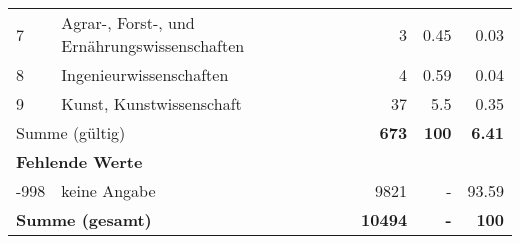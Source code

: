 \begin{longtable}{lXrrr}
     7 &
     \multicolumn{1}{X}{ Agrar-, Forst-, und Ernährungswissenschaften   } &


       \num{3} &
       \num[round-mode=places,round-precision=2]{0.45} &
         \num[round-mode=places,round-precision=2]{0.03} \\

     8 &
     \multicolumn{1}{X}{ Ingenieurwissenschaften   } &


       \num{4} &
       \num[round-mode=places,round-precision=2]{0.59} &
         \num[round-mode=places,round-precision=2]{0.04} \\

     9 &
     \multicolumn{1}{X}{ Kunst, Kunstwissenschaft   } &


       \num{37} &
       \num[round-mode=places,round-precision=2]{5.5} &
         \num[round-mode=places,round-precision=2]{0.35} \\
     \midrule
     \multicolumn{2}{l}{Summe (gültig)} &
       \textbf{\num{673}} &
     \textbf{\num{100}} &
       \textbf{\num[round-mode=places,round-precision=2]{6.41}} \\
     \multicolumn{5}{l}{\textbf{Fehlende Werte}}\\
       -998 &
       keine Angabe &
         \num{9821} &
        - &
         \num[round-mode=places,round-precision=2]{93.59} \\
     \midrule
     \multicolumn{2}{l}{\textbf{Summe (gesamt)}} &
          \textbf{\num{10494}} &
        \textbf{-} &
        \textbf{\num{100}} \\
     \bottomrule
     \end{longtable}
     

